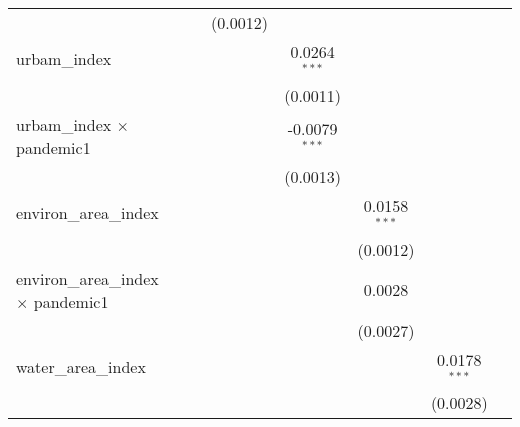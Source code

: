 \begin{table}[htbp]
\begin{threeparttable}[b]
\begin{tabular}{lccccccc}
                                                    &                         &                        & (0.0012)               &                         &                 &                 &   \\   
         urbam\_index                               &                         &                        &                        & 0.0264$^{***}$          &                 &                 &   \\   
                                                    &                         &                        &                        & (0.0011)                &                 &                 &   \\   
         urbam\_index $\times$ pandemic1            &                         &                        &                        & -0.0079$^{***}$         &                 &                 &   \\   
                                                    &                         &                        &                        & (0.0013)                &                 &                 &   \\   
         environ\_area\_index                       &                         &                        &                        &                         & 0.0158$^{***}$  &                 &   \\   
                                                    &                         &                        &                        &                         & (0.0012)        &                 &   \\   
         environ\_area\_index $\times$ pandemic1    &                         &                        &                        &                         & 0.0028          &                 &   \\   
                                                    &                         &                        &                        &                         & (0.0027)        &                 &   \\   
         water\_area\_index                         &                         &                        &                        &                         &                 & 0.0178$^{***}$  &   \\   
                                                    &                         &                        &                        &                         &                 & (0.0028)        &   \\   

\end{tabular}
\end{threeparttable}
\end{table}
